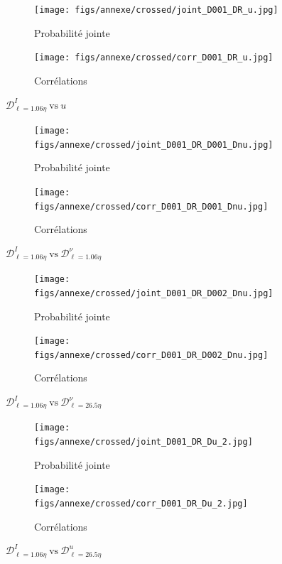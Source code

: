 \documentclass[13pt, a4paper]{extarticle}
\begin{document}
\begin{figure}[H]
  \centering
  \begin{subfigure}[b]{0.48\linewidth}
  \centering
  \texttt{[image: figs/annexe/crossed/joint\_D001\_DR\_u.jpg]}
  \caption{Probabilité jointe}
  \end{subfigure}
  \begin{subfigure}[b]{0.48\linewidth}
    \centering
    \texttt{[image: figs/annexe/crossed/corr\_D001\_DR\_u.jpg]}
    \caption{Corrélations}
    \end{subfigure}
    \caption{$\mathscr{D}^I_{\ell=1.06\eta}~\text{vs}~u$}
\end{figure}

\begin{figure}[H]
  \centering
  \begin{subfigure}[b]{0.48\linewidth}
  \centering
  \texttt{[image: figs/annexe/crossed/joint\_D001\_DR\_D001\_Dnu.jpg]}
  \caption{Probabilité jointe}
  \end{subfigure}
  \begin{subfigure}[b]{0.48\linewidth}
    \centering
    \texttt{[image: figs/annexe/crossed/corr\_D001\_DR\_D001\_Dnu.jpg]}
    \caption{Corrélations}
    \end{subfigure}
    \caption{$\mathscr{D}^I_{\ell=1.06\eta}~\text{vs}~\mathscr{D}^\nu_{\ell=1.06\eta}$}
\end{figure}

\begin{figure}[H]
  \centering
  \begin{subfigure}[b]{0.48\linewidth}
  \centering
  \texttt{[image: figs/annexe/crossed/joint\_D001\_DR\_D002\_Dnu.jpg]}
  \caption{Probabilité jointe}
  \end{subfigure}
  \begin{subfigure}[b]{0.48\linewidth}
    \centering
    \texttt{[image: figs/annexe/crossed/corr\_D001\_DR\_D002\_Dnu.jpg]}
    \caption{Corrélations}
    \end{subfigure}
    \caption{$\mathscr{D}^I_{\ell=1.06\eta}~\text{vs}~\mathscr{D}^\nu_{\ell=26.5\eta}$}
\end{figure}

\begin{figure}[H]
  \centering
  \begin{subfigure}[b]{0.48\linewidth}
  \centering
  \texttt{[image: figs/annexe/crossed/joint\_D001\_DR\_Du\_2.jpg]}
  \caption{Probabilité jointe}
  \end{subfigure}
  \begin{subfigure}[b]{0.48\linewidth}
    \centering
    \texttt{[image: figs/annexe/crossed/corr\_D001\_DR\_Du\_2.jpg]}
    \caption{Corrélations}
    \end{subfigure}
    \caption{$\mathscr{D}^I_{\ell=1.06\eta}~\text{vs}~\mathscr{D}^u_{\ell=26.5\eta}$}
\end{figure}
\end{document}
